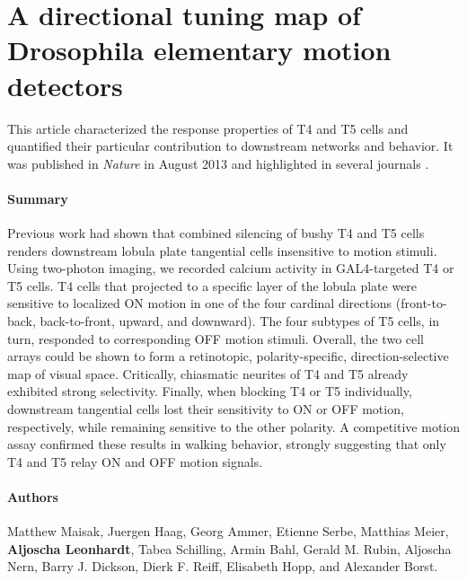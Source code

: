 \section{A directional tuning map of Drosophila elementary motion detectors}
\label{sct:manuscript_maisak}

This article characterized the response properties of T4 and T5 cells and quantified their particular contribution to downstream networks and behavior. It was published in \textit{Nature} in August 2013 \citep{Maisak:2013kk} and highlighted in several journals \citep{Masland:2013kv,Gilbert:2013aa,Yonehara:2013aa,Flight:2013aa}.

\paragraph{Summary}
Previous work had shown that combined silencing of bushy T4 and T5 cells renders downstream lobula plate tangential cells insensitive to motion stimuli. Using two-photon imaging, we recorded calcium activity in GAL4-targeted T4 or T5 cells. T4 cells that projected to a specific layer of the lobula plate were sensitive to localized ON motion in one of the four cardinal directions (front-to-back, back-to-front, upward, and downward). The four subtypes of T5 cells, in turn, responded to corresponding OFF motion stimuli. Overall, the two cell arrays could be shown to form a retinotopic, polarity-specific, direction-selective map of visual space. Critically, chiasmatic neurites of T4 and T5 already exhibited strong selectivity. Finally, when blocking T4 or T5 individually, downstream tangential cells lost their sensitivity to ON or OFF motion, respectively, while remaining sensitive to the other polarity. A competitive motion assay confirmed these results in walking behavior, strongly suggesting that only T4 and T5 relay ON and OFF motion signals.

\paragraph{Authors}
Matthew Maisak, Juergen Haag, Georg Ammer, Etienne Serbe, Matthias Meier, \textbf{Aljoscha Leonhardt}, Tabea Schilling, Armin Bahl, Gerald M. Rubin, Aljoscha Nern, Barry J. Dickson, Dierk F. Reiff, Elisabeth Hopp, and Alexander Borst.

